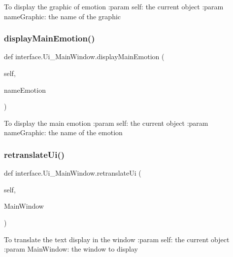 \begin{DoxyVerb}To display the graphic of emotion
:param self: the current object
:param nameGraphic: the name of the graphic
\end{DoxyVerb}
 \mbox{\label{classinterface_1_1_ui___main_window_a246eae494e4d250a84559e83a787f185}} 
\subsubsection{\texorpdfstring{display\+Main\+Emotion()}{displayMainEmotion()}}
{\footnotesize\ttfamily def interface.\+Ui\+\_\+\+Main\+Window.\+display\+Main\+Emotion (\begin{DoxyParamCaption}\item[{}]{self,  }\item[{}]{name\+Emotion }\end{DoxyParamCaption})}

\begin{DoxyVerb}To display the main emotion
:param self: the current object
:param nameGraphic: the name of the emotion
\end{DoxyVerb}
 \mbox{\label{classinterface_1_1_ui___main_window_ac07050b921374440e9140d6ee459ea85}} 
\subsubsection{\texorpdfstring{retranslate\+Ui()}{retranslateUi()}}
{\footnotesize\ttfamily def interface.\+Ui\+\_\+\+Main\+Window.\+retranslate\+Ui (\begin{DoxyParamCaption}\item[{}]{self,  }\item[{}]{Main\+Window }\end{DoxyParamCaption})}

\begin{DoxyVerb}To translate the text display in the window
:param self: the current object
:param MainWindow: the window to display 
\end{DoxyVerb}
 \mbox{\label{classinterface_1_1_ui___main_window_aacf11f369e7a96c6d0bf1305cfcedf88}} 
